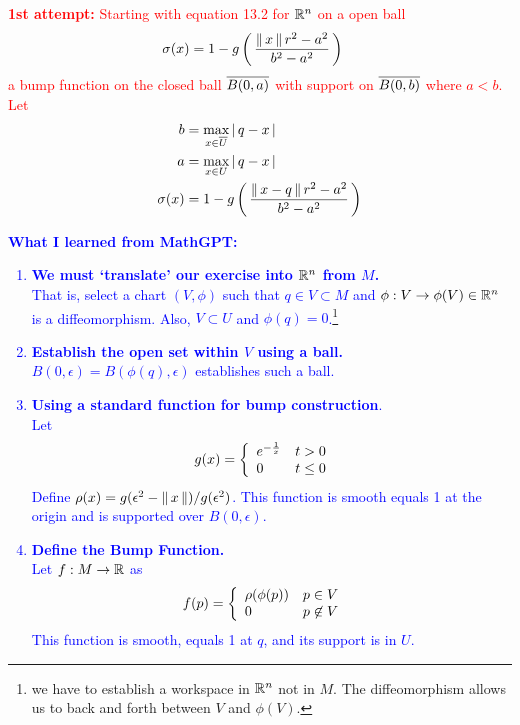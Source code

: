\documentclass[12pt,a4paper]{report}
\newcommand{\RED}[1]{\textcolor{red}{#1}}
\newcommand{\BLUE}[1]{\textcolor{blue}{#1}}
\begin{document}
\begin{description}
	\RED{\textbf{1st attempt: }Starting with equation 13.2 for $\mathbb{R}^n$ on a open ball
	\begin{align*}
		\sigma(x) &= 1-g\left (\, \frac{\left \| \, x \,\right \|r^2-a^2}{b^2-a^2} \,\right )
	\end{align*}a bump function on the closed ball $\overline{B(0,a)}$ with support on $\overline{B(0,b)}$ where $a < b$.  Let 
	\begin{align*}
		b &= \max_{x\in \overline{U}} \left |\, q-x \,\right | \\
		a &= \max_{x\in U} \left |\, q-x \,\right | \\
		\sigma(x) &= 1-g\left (\, \frac{\left \| \, x-q \,\right \|r^2-a^2}{b^2-a^2} \,\right )
	\end{align*}
	}
	\BLUE{\textbf{What I learned from MathGPT:}
	\begin{enumerate}
		\item \textbf{We must `translate' our exercise into $\mathbb{R}^n$ from $M$.} \\ That is, select a chart $(V, \phi)$ such that $q\in V \subset M$ and $\phi: V \to \phi(V) \in \mathbb{R}^n$ is a diffeomorphism.  Also, $V\subset U$ and $\phi(q) = 0$.\footnote{we have to establish a workspace in $\mathbb{R}^n$ not in $M$.  The diffeomorphism allows us to back and forth between $V$ and $\phi(V)$.}
		\item \textbf{Establish the open set within $V$ using a ball.} \\ $B(0,\epsilon) = B(\phi(q), \epsilon)$ establishes such a ball.
		\item \textbf{Using a standard function for bump construction}.\\  Let 
		\begin{align*}
			g(x) &= \left \{ \begin{array}{ll} e^{-\frac{1}{x}} & t>0\\ 0 & t \le 0 \end{array} \right .
		\end{align*}	Define $\rho(x) = g(\epsilon^2-\left \| \, x \,\right \|)/g(\epsilon^2)$.  This function is smooth equals 1 at the origin and is supported over $B(0,\epsilon)$.
		\item \textbf{Define the Bump Function.}\\
		Let $f: M \to \mathbb{R}$ as
		\begin{align*}
			f(p) &= \left \{ \begin{array}{ll} \rho(\phi(p)) & p \in V\\ 0 & p \not \in V \end{array} \right .
		\end{align*}This function is smooth, equals 1 at $q$, and its support is in $U$.
	\end{enumerate}	}
	
\end{description}
\end{document}
